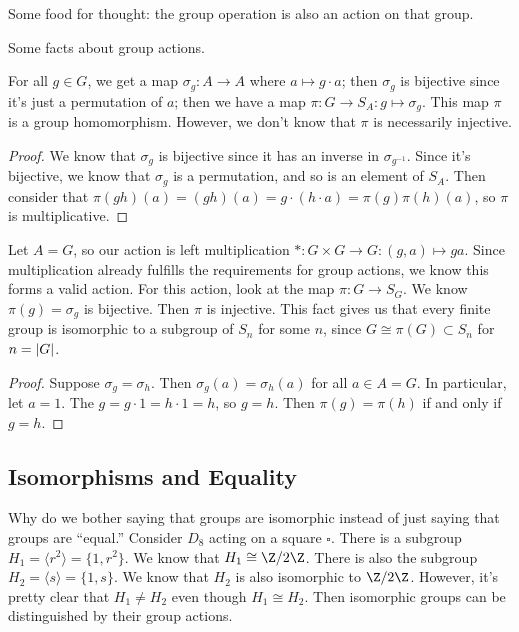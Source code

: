 \begin{example}
Some food for thought: the group operation is also an action on that group.
\end{example}

Some facts about group actions.
\begin{lemma}
For all $g \in G$, we get a map $\sigma_g : A \to A$ where $a \mapsto g\cdot a$; then $\sigma_g$ is bijective since it's just a permutation of $a$; then we have a map $\pi : G \to S_A : g \mapsto \sigma_g$.
This map $\pi$ is a group homomorphism. However, we don't know that $\pi$ is necessarily injective.
\end{lemma}
\begin{proof}
We know that $\sigma_g$ is bijective since it has an inverse in $\sigma_{g^{-1}}$. Since it's bijective, we know that $\sigma_g$ is a permutation, and so is an element of $S_A$. Then consider that $\pi(gh)(a) =  (gh)(a) = g \cdot (h \cdot a) = \pi(g)\pi(h)(a)$, so $\pi$ is multiplicative.
\end{proof}

\begin{example}
Let $A = G$, so our action is left multiplication $\ast : G \times G \to G : (g,a) \mapsto ga$. Since multiplication already fulfills the requirements for group actions, we know this forms a valid action. For this action, look at the map $\pi : G \to S_G$. We know $\pi(g) = \sigma_g$ is bijective. Then $\pi$ is injective. This fact gives us that every finite group is isomorphic to a subgroup of $S_n$ for some $n$, since $G \cong \pi(G) \subset S_n$ for $n = \abs{G}$.

\begin{proof}
Suppose $\sigma_g = \sigma_h$. Then $\sigma_g(a) = \sigma_h(a)$ for all $a \in A = G$. In particular, let $a = 1$. The $g = g \cdot 1 = h \cdot 1 = h$, so $g = h$. Then $\pi(g) = \pi(h)$ if and only if $g = h$.
\end{proof}
\end{example}

\subsection{Isomorphisms and Equality}
Why do we bother saying that groups are isomorphic instead of just saying that groups are ``equal.'' Consider $D_{8}$ acting on a square $\square$. There is a subgroup $H_1 = \langle r^2 \rangle = \{1, r^2\}$. We know that $H_1 \cong \Z/2\Z$. There is also the subgroup $H_2 = \langle s \rangle = \{1,s\}$. We know that $H_2$ is also isomorphic to $\Z/2\Z$. However, it's pretty clear that $H_1 \not= H_2$ even though $H_1 \cong H_2$. Then isomorphic groups can be distinguished by their group actions.
